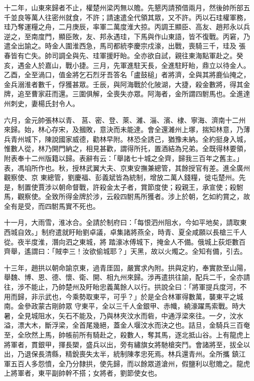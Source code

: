 \begin{pinyinscope}
 十二年，山東來歸者不止，權楚州梁丙無以贍。先懇丙請預借兩月，然後帥所部五千並良等萬人往密州就食，不許；請速遣全代領其眾，又不許。丙以石珪權軍務，珪乃奪運糧之舟，二月庚辰，率軍二萬度淮大掠。丙調王顯臣、高友、趙邦永以兵逆之，至南度門，顯臣敗，友、邦永遇珪，下馬與作山東語，皆不復戰。丙窘，乃遣全出諭之。時金人圍淮西急，馬司都統李慶宗戍濠，出戰，喪騎三千，珪及
 張春皆有亡失。帥司調全與先、珪軍援盱眙。全亦欲自試，親往東海點軍赴之。癸亥，遇金人於嘉山，戰小捷。三月，先軍進駐天長，全進駐盱眙，鼎立以待金人。乙酉，全至渦口，值金將乞石烈牙吾答名「盧鼓槌」者將濟，全與其將鹿仙掩之，金兵溺淮者數千，俘獲甚眾。壬辰，與阿海戰於化陂湖，大捷，殺金數將，得其金牌，追至曹家莊而還。三圍俱解，全喪失亦眾。阿海者，金所謂四駙馬也。全進達州刺史，妻楊氏封令人。



 六月，金元帥張林以青、
 莒、密、登、萊、濰、淄、濱、棣、寧海、濟南十二州來歸。始，林心存宋，及摑敗，意決而未能達。會全還濰州上塚，揣知林意，乃薄兵青州城下，陳說國家威德，勸林早附。林恐全誘己，猶豫未納。全約挺身入城，惟數人從，林乃開門納之，相見甚歡，謂得所托，置酒結為兄弟。全既得林要領，附表奉十二州版籍以歸。表辭有云：「舉諸七十城之全齊，歸我三百年之舊主。」表，馮垍所作也。秋，授林武翼大夫、京東安撫兼總管，其餘授官有差。進全廣州觀察使、京
 東總管，劉慶福、彭義斌皆為統制，增放二萬人錢糧，徙屯楚州。先是，制置使賈涉以朝命督戰，許殺金太子者，賞節度使；殺親王，承宣使；殺駙馬，觀察使。全致所得金牌於涉，云殺四駙馬所獲者。涉上於朝，乞如約賞之，故全有是受，而四駙馬實不死也。



 十一月，大雨雪，淮冰合。全請於制府曰：「每恨泗州阻水，今如平地矣，請取東西城自效。」制府遣就盱眙劉卓議，卓集諸將燕全，時青、夏全咸願以長槍三千人從。夜半度淮，潛向泗之東城，將
 踏濠冰傅城下，掩金人不備。俄城上荻炬數百齊舉，遙謂曰：「賊李三！汝欲偷城耶？」天黑，故以火燭之。全知有備，引去。



 十三年，趙拱以朝命諭京東，過青厓固，嚴實求內附。拱與定約，奉實款至山陽，舉魏、博、恩、德、懷、衛、開、相九州來歸。涉再遣拱往諭，配兵二千，全亦請往，涉不能止，乃帥楚州及盱眙忠義萬餘人以行。拱說全曰：「將軍提兵度河，不用而歸，非示武也，今乘勢取東平，可乎？」於是全合林軍得數萬，襲東平之城南。金參政蒙古剛帥眾
 守東平，全以三千人金銀甲、赤幟，繞濠躍馬索戰。時大暑，全見城阻水，矢石不能及，乃與林夾汶水而砦，中通浮梁來往。一夕，汶水溢，漂大木，斷浮梁，全首尾幾絕，蓋金人堰汶水而決之也。詰旦，金騎兵三百奄至，全欣然上馬，帥帳前所有騎赴之，殺數人，奪其馬，逐北抵山谷。上有龍虎上將軍者，貫銀甲，揮長槊，盛兵以出，旁有繡旗女將馳槍突鬥。會諸將至，拔全以出，乃退保長清縣，精銳喪失太半，統制陳孝忠死焉。林兵還青州。全所攜
 鎮江軍五百人多怨憤，全乃分隸拱，使先歸，而以餘眾道滄州，假鹽利以慰贍之。龍虎上將軍者，東平副帥幹不搭；女將者，劉節使女也。




\end{pinyinscope}
